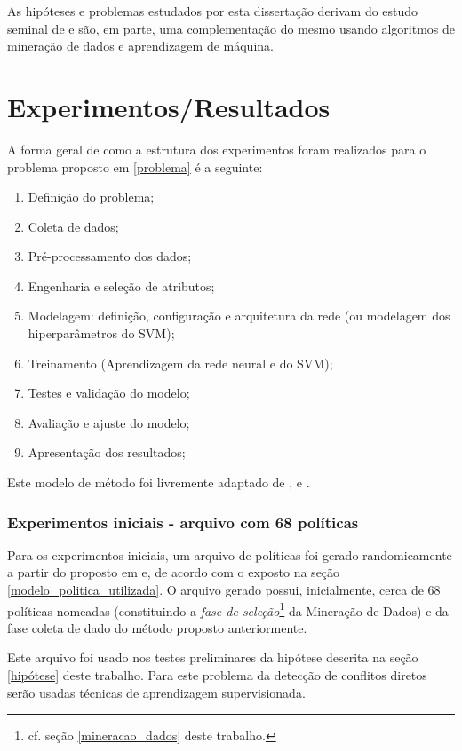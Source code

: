 As hipóteses e problemas estudados por esta dissertação derivam do estudo seminal de \cite{sarkis2017} e são, em parte, uma complementação do mesmo usando algoritmos de mineração de dados e aprendizagem de máquina.

\chapter{Experimentos/Resultados}\label{resultados}
A forma geral de como a estrutura dos experimentos foram realizados para o problema proposto em \ref{problema} é a seguinte:
\begin{enumerate}
	\item Definição do problema;
	\item Coleta de dados;
	\item Pré-processamento dos dados;
	\item Engenharia e seleção de atributos;
	\item Modelagem: definição, configuração e arquitetura da rede (ou modelagem dos hiperparâmetros do SVM);
	\item Treinamento (Aprendizagem da rede neural e do SVM);
	\item Testes e validação do modelo;
		\item Avaliação e ajuste do modelo;
	\item Apresentação dos resultados;
\end{enumerate}

Este modelo de método foi livremente adaptado de \cite{lima_ia_2016}, \cite{silva_redes_2016} e \cite{haykin_redes_2001}.

\subsection{Experimentos iniciais - arquivo com 68 políticas}
Para os experimentos iniciais, um arquivo de políticas foi gerado randomicamente a partir do proposto em \cite{sarkis2017} e, de acordo com o exposto na seção \ref{modelo_politica_utilizada}. O arquivo gerado possui, inicialmente, cerca de 68 políticas nomeadas (constituindo a \textit{fase de seleção}\footnote{cf. seção \ref{mineracao_dados} deste trabalho.} da Mineração de Dados) e da fase coleta de dado do método proposto anteriormente. 

Este arquivo foi usado nos testes preliminares da hipótese descrita na seção \ref{hipótese} deste trabalho. Para este problema da detecção de conflitos diretos serão usadas técnicas de aprendizagem supervisionada. 

